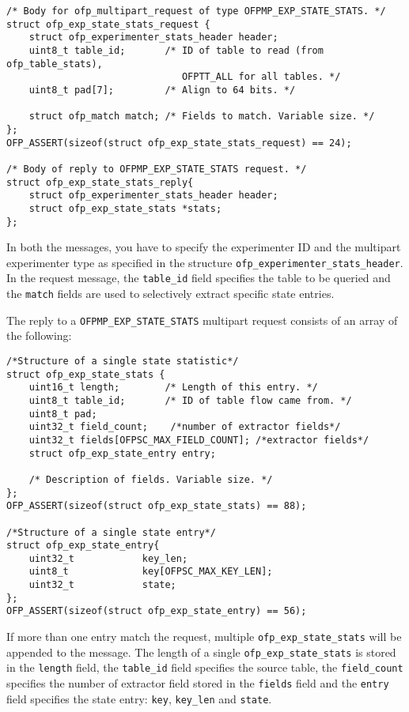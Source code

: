 \begin{verbatim}
/* Body for ofp_multipart_request of type OFPMP_EXP_STATE_STATS. */
struct ofp_exp_state_stats_request {
    struct ofp_experimenter_stats_header header;
    uint8_t table_id;       /* ID of table to read (from ofp_table_stats),
                               OFPTT_ALL for all tables. */
    uint8_t pad[7];         /* Align to 64 bits. */
    
    struct ofp_match match; /* Fields to match. Variable size. */
};
OFP_ASSERT(sizeof(struct ofp_exp_state_stats_request) == 24);

/* Body of reply to OFPMP_EXP_STATE_STATS request. */
struct ofp_exp_state_stats_reply{
    struct ofp_experimenter_stats_header header;
    struct ofp_exp_state_stats *stats;
};
\end{verbatim}
In both the messages, you have to specify the experimenter ID and the multipart experimenter type as specified in the structure \texttt{ofp\_experimenter\_stats\_header}.
In the request message, the \texttt{table\_id} field specifies the table to be queried and the \texttt{match} fields are used to selectively extract specific state entries.

The reply to a \texttt{OFPMP\_EXP\_STATE\_STATS} multipart request consists of an array of the following:

\begin{verbatim}
/*Structure of a single state statistic*/
struct ofp_exp_state_stats {
    uint16_t length;        /* Length of this entry. */
    uint8_t table_id;       /* ID of table flow came from. */
    uint8_t pad;
    uint32_t field_count;    /*number of extractor fields*/
    uint32_t fields[OFPSC_MAX_FIELD_COUNT]; /*extractor fields*/    
    struct ofp_exp_state_entry entry;
    
    /* Description of fields. Variable size. */
};
OFP_ASSERT(sizeof(struct ofp_exp_state_stats) == 88);

/*Structure of a single state entry*/
struct ofp_exp_state_entry{
    uint32_t            key_len;
    uint8_t             key[OFPSC_MAX_KEY_LEN];
    uint32_t            state;
};
OFP_ASSERT(sizeof(struct ofp_exp_state_entry) == 56);
\end{verbatim}
If more than one entry match the request, multiple \texttt{ofp\_exp\_state\_stats} will be appended to the message.
The length of a single \texttt{ofp\_exp\_state\_stats} is stored in the \texttt{length} field, the \texttt{table\_id} field specifies the source table, the \texttt{field\_count} specifies the number of extractor field stored in the \texttt{fields} field and the \texttt{entry} field specifies the state entry: \texttt{key}, \texttt{key\_len} and \texttt{state}.

